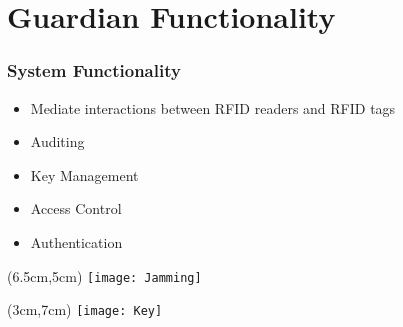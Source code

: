 \section{Guardian Functionality}

\begin{frame}
 \frametitle{System Functionality}

 \begin{itemize}
  \item Mediate interactions between RFID readers and RFID tags
  \item Auditing
  \item Key Management
  \item Access Control
  \item Authentication
 \end{itemize}

 \begin{textblock*}{5cm}(6.5cm,5cm)
  \texttt{[image: Jamming]}
 \end{textblock*}



 \begin{textblock*}{5cm}(3cm,7cm)
  \texttt{[image: Key]}
 \end{textblock*}


\end{frame}
